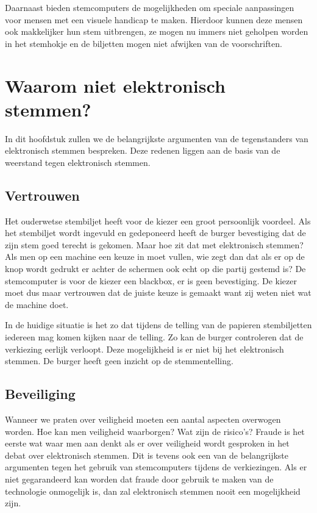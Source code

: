\documentclass[a4paper]{article}
\begin{document}
Daarnaast bieden stemcomputers de mogelijkheden om speciale aanpassingen voor mensen met een visuele handicap te maken.
Hierdoor kunnen deze mensen ook makkelijker hun stem uitbrengen, ze mogen nu immers niet geholpen worden in het stemhokje en de biljetten mogen niet afwijken van de voorschriften.

\newpage

\section{Waarom niet elektronisch stemmen?}
\label{text:tegen}
In dit hoofdstuk zullen we de belangrijkste argumenten van de tegenstanders van elektronisch stemmen bespreken.
Deze redenen liggen aan de basis van de weerstand tegen elektronisch stemmen.

\subsection{Vertrouwen}
Het ouderwetse stembiljet heeft voor de kiezer een groot persoonlijk voordeel. 
Als het stembiljet wordt ingevuld en gedeponeerd heeft de burger bevestiging dat de zijn stem goed terecht is gekomen. 
Maar hoe zit dat met elektronisch stemmen?
Als men op een machine een keuze in moet vullen, wie zegt dan dat als er op de knop wordt gedrukt er achter de schermen ook echt op die partij gestemd is?
De stemcomputer is voor de kiezer een blackbox, er is geen bevestiging.
De kiezer moet dus maar vertrouwen dat de juiste keuze is gemaakt want zij weten niet wat de machine doet.

In de huidige situatie is het zo dat tijdens de telling van de papieren stembiljetten iedereen mag komen kijken naar de telling.
Zo kan de burger controleren dat de verkiezing eerlijk verloopt.
Deze mogelijkheid is er niet bij het elektronisch stemmen.
De burger heeft geen inzicht op de stemmentelling. 

\subsection{Beveiliging}
Wanneer we praten over veiligheid moeten een aantal aspecten overwogen worden. 
Hoe kan men veiligheid waarborgen? 
Wat zijn de risico's?
Fraude is het eerste wat waar men aan denkt als er over veiligheid wordt gesproken in het debat over elektronisch stemmen.
Dit is tevens ook een van de belangrijkste argumenten tegen het gebruik van stemcomputers tijdens de verkiezingen.
Als er niet gegarandeerd kan worden dat fraude door gebruik te maken van de technologie onmogelijk is, dan zal elektronisch stemmen nooit een mogelijkheid zijn.
\end{document}
